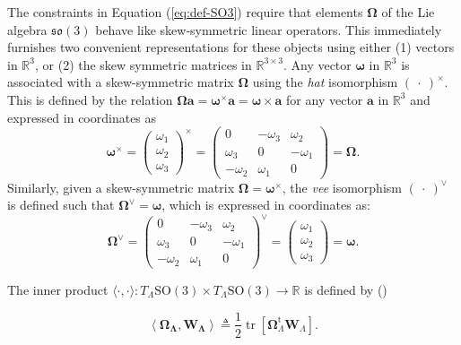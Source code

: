 The constraints in Equation (\ref{eq:def-SO3}) require that 
elements \(\bm{\Omega}\) of the Lie algebra \(\mathfrak{so}(3)\) behave like skew-symmetric linear operators. This immediately furnishes two convenient representations for these objects using either (1) vectors in \(\mathbb{R}^3\), or (2) the skew symmetric matrices in \(\mathbb{R}^{3 \times 3}\). 
Any vector \(\bm{\omega}\) in \(\mathbb{R}^3\) is associated
with a skew-symmetric matrix \(\bm{\Omega}\) using the \emph{hat} isomorphism
\((~\cdot~)^{\times}\). %
This is defined by the relation
\(\bm{\Omega}\bm{a} = \bm{\omega}^{\times} \bm{a}=\bm{\omega}\times \bm{a}\)
for any vector \(\bm{a}\) in \(\mathbb{R}^3\) and expressed in
coordinates as
\begin{equation}
\bm{\omega}^{\times}=\begin{pmatrix}
\omega_1 \\
\omega_2 \\
\omega_3
\end{pmatrix}^{\times}=\begin{pmatrix}
0 & -\omega_3 & \omega_2 \\
\omega_3 & 0 & -\omega_1 \\
-\omega_2 & \omega_1 & 0
\end{pmatrix} = \bm{\Omega}.
\label{eq:hat}\end{equation}
Similarly, given a skew-symmetric matrix \(\bm{\Omega}=\bm{\omega}^{\times}\),
the \emph{vee} isomorphism \((~\cdot~)^{\vee}\) is defined such that
\(\bm{\Omega}^{\vee}=\bm{\omega}\), which is expressed in
coordinates as: \begin{equation}
\bm{\Omega}^{\vee}= \begin{pmatrix}
0 & -\omega_3 & \omega_2 \\
\omega_3 & 0 & -\omega_1 \\
-\omega_2 & \omega_1 & 0
\end{pmatrix}^{\vee} = \begin{pmatrix}
\omega_1 \\
\omega_2 \\
\omega_3
\end{pmatrix}
= \bm{\omega}.
\label{eq:vee}\end{equation}

The inner product
\(\langle\cdot, \cdot\rangle\colon T_{\scriptscriptstyle{\Lambda}} \mathrm{SO}(3) \times T_{\scriptscriptstyle{\Lambda}} \mathrm{SO}(3) \rightarrow \mathbb{R}\)
is defined by (\cite{abraham1994foundations})

\begin{equation}
\left\langle\bm{\Omega}_{\bm{\Lambda}}, \bm{W}_{\bm{\Lambda}}\right\rangle
\triangleq \frac{1}{2} \operatorname{tr}\left[\bm{\Omega}_{\scriptscriptstyle{\Lambda}}^{\mathrm{t}} \bm{W}_{\scriptscriptstyle{\Lambda}}\right].
\label{eq:def-SO3-inner}\end{equation}
